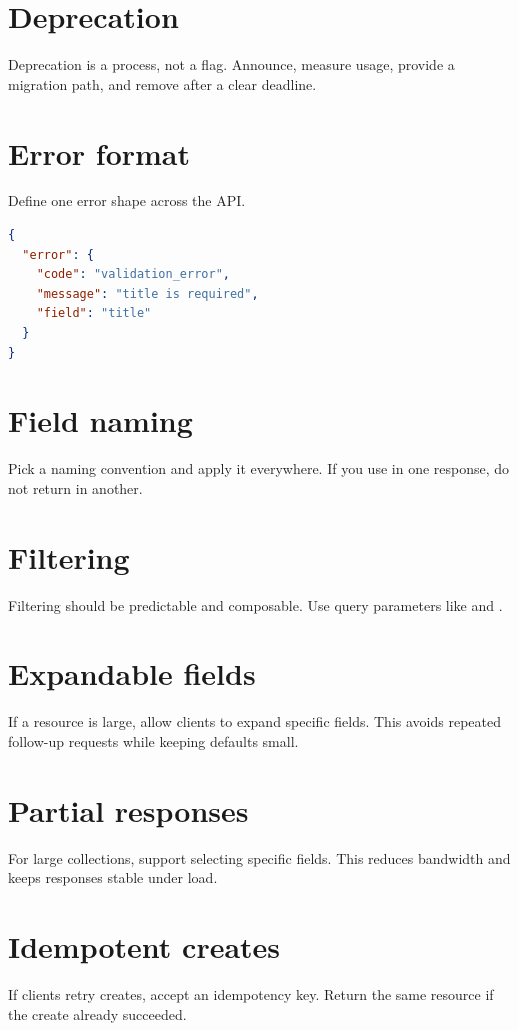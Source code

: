 \section{Deprecation}
Deprecation is a process, not a flag.
Announce, measure usage, provide a migration path, and remove after a clear deadline.

\section{Error format}
Define one error shape across the API.

\begin{lstlisting}[language=JSON]
{
  "error": {
    "code": "validation_error",
    "message": "title is required",
    "field": "title"
  }
}
\end{lstlisting}

\section{Field naming}
Pick a naming convention and apply it everywhere.
If you use  in one response, do not return  in another.

\section{Filtering}
Filtering should be predictable and composable.
Use query parameters like  and .

\section{Expandable fields}
If a resource is large, allow clients to expand specific fields.
This avoids repeated follow-up requests while keeping defaults small.

\section{Partial responses}
For large collections, support selecting specific fields.
This reduces bandwidth and keeps responses stable under load.

\section{Idempotent creates}
If clients retry creates, accept an idempotency key.
Return the same resource if the create already succeeded.

